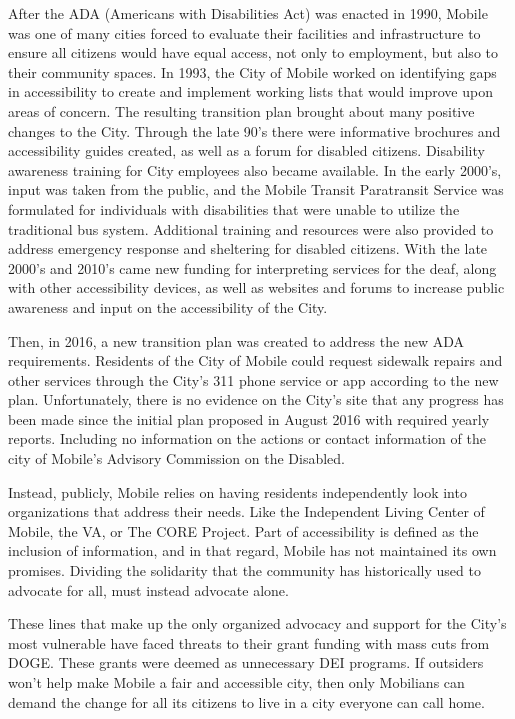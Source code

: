 \documentclass[
]{book}
\begin{document}
After the ADA (Americans with Disabilities Act) was enacted in 1990, Mobile was one of many cities forced to evaluate their facilities and infrastructure to ensure all citizens would have equal access, not only to employment, but also to their community spaces. In 1993, the City of Mobile worked on identifying gaps in accessibility to create and implement working lists that would improve upon areas of concern. The resulting transition plan brought about many positive changes to the City. Through the late 90's there were informative brochures and accessibility guides created, as well as a forum for disabled citizens. Disability awareness training for City employees also became available. In the early 2000's, input was taken from the public, and the Mobile Transit Paratransit Service was formulated for individuals with disabilities that were unable to utilize the traditional bus system. Additional training and resources were also provided to address emergency response and sheltering for disabled citizens. With the late 2000's and 2010's came new funding for interpreting services for the deaf, along with other accessibility devices, as well as websites and forums to increase public awareness and input on the accessibility of the City.

Then, in 2016, a new transition plan was created to address the new ADA requirements. Residents of the City of Mobile could request sidewalk repairs and other services through the City's 311 phone service or app according to the new plan. Unfortunately, there is no evidence on the City's site that any progress has been made since the initial plan proposed in August 2016 with required yearly reports. Including no information on the actions or contact information of the city of Mobile's Advisory Commission on the Disabled.

Instead, publicly, Mobile relies on having residents independently look into organizations that address their needs. Like the Independent Living Center of Mobile, the VA, or The CORE Project. Part of accessibility is defined as the inclusion of information, and in that regard, Mobile has not maintained its own promises. Dividing the solidarity that the community has historically used to advocate for all, must instead advocate alone.

These lines that make up the only organized advocacy and support for the City's most vulnerable have faced threats to their grant funding with mass cuts from DOGE. These grants were deemed as unnecessary DEI programs. If outsiders won't help make Mobile a fair and accessible city, then only Mobilians can demand the change for all its citizens to live in a city everyone can call home.
\end{document}
